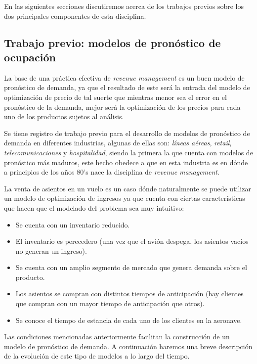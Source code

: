 {En las siguientes secciones discutiremos acerca de los trabajos previos sobre los dos principales componentes de esta disciplina.

\subsection*{Trabajo previo: modelos de pronóstico de ocupación}

La base de una práctica efectiva de \emph{revenue management} es un buen modelo de pronóstico de demanda, ya que el resultado de este será la entrada del modelo de optimización de precio de tal suerte que mientras menor sea el error en el pronóstico de la demanda, mejor será la optimización de los precios para cada uno de los productos sujetos al análisis.

Se tiene registro de trabajo previo para el desarrollo de modelos de pronóstico de demanda en diferentes industrias, algunas de ellas son: \emph{líneas aéreas}, \emph{retail}, \emph{telecomunicaciones} y \emph{hospitalidad}, siendo la primera la que cuenta con modelos de pronóstico más maduros, este hecho obedece a que en esta industria es en dónde a principios de los años 80's nace la disciplina de \emph{revenue management}. 

La venta de asientos en un vuelo es un caso dónde naturalmente se puede utilizar un modelo de optimización de ingresos ya que cuenta con ciertas características que hacen que el modelado del problema sea muy intuitivo:
\begin{itemize}
  \item Se cuenta con un inventario reducido.
  \item El inventario es perecedero (una vez que el avión despega, los asientos vacíos no generan un ingreso).
  \item Se cuenta con un amplio segmento de mercado que genera demanda sobre el producto.
  \item Los asientos se compran con distintos tiempos de anticipación (hay clientes que compran con un mayor tiempo de anticipación que otros).
  \item Se conoce el tiempo de estancia de cada uno de los clientes en la aeronave.
\end{itemize}

Las condiciones mencionadas anteriormente facilitan la construcción de un modelo de pronóstico de demanda. A continuación haremos una breve descripción de la evolución de este tipo de modelos a lo largo del tiempo.

}
